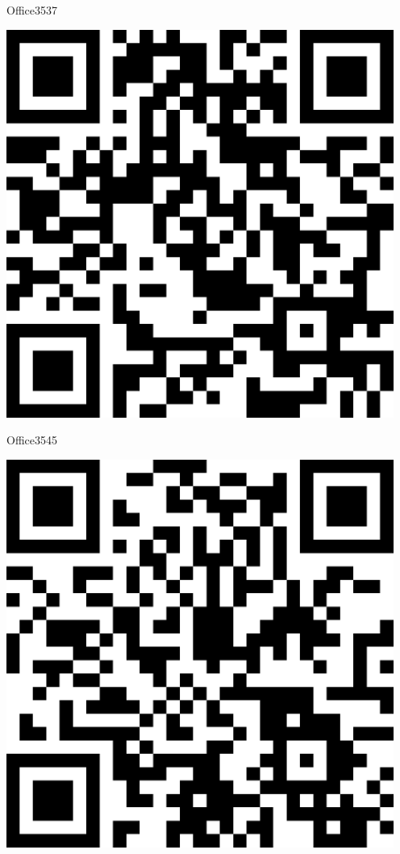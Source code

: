 \documentclass[letterpaper]{article}
\begin{document}
 \hfill{\small Office3537} 

 \vspace{1in} 
 \pagebreak 
{} 
 \vspace*{\fill} 
 \begingroup 
 \centerline{\includegraphics[scale=1,width=5in,height=5in]{Office3545.png}} 
 \endgroup 
 \vspace*{\fill} 

 \hfill{\small Office3545} 

 \vspace{1in} 
 \pagebreak 
{} 
 \vspace*{\fill} 
 \begingroup 
 \centerline{\includegraphics[scale=1,width=5in,height=5in]{Office3547.png}} 
 \endgroup 
 \vspace*{\fill} 
\end{document}
